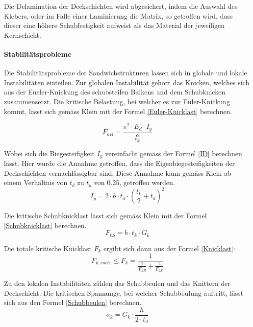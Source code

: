     Die Delamination der Deckschichten wird abgesichert, indem die Auswahl des Klebers, oder im Falle einer Laminierung die Matrix, so getroffen wird, dass dieser eine höhere Schubfestigkeit aufweist als das Material der jeweiligen Kernschicht.

    \paragraph{Stabilitätsprobleme}
    Die Stabilitätsprobleme der Sandwichstrukturen lassen sich in globale und lokale Instabilitäten einteilen. Zur globalen Instabilität gehört das Knicken, welches sich aus der Eueler-Knickung des schubsteifen Balkens und dem Schubknicken zusammensetzt. Die kritische Belastung, bei welcher es zur Euler-Knickung kommt, lässt sich gemäss Klein \cite{klein} mit der Formel \ref{Euler-Knicklast} berechnen.

    \begin{equation}
      \label{Euler-Knicklast}
      F_{kB}=\frac{\pi^2 \cdot E_d \cdot I_y}{l_k^{2}}
    \end{equation}

    Wobei sich die Biegesteifigkeit $I_y$ vereinfacht gemäss der Formel \ref{ID} berechnen lässt. Hier wurde die Annahme getroffen, dass die Eigenbiegesteifigkeiten der Deckschichten vernachlässigbar sind. Diese Annahme kann gemäss Klein \cite{klein} ab einem Verhältnis von $t_d$ zu $t_k$ von 0.25, getroffen werden.
    \begin{equation}
      \label{ID}
      I_y = 2 \cdot b \cdot t_d \cdot \left( \frac{t_k}{2} + t_d \right )^{2}
    \end{equation}

    Die kritische Schubknicklast lässt sich gemäss Klein \cite{klein} mit der Formel \ref{Schubknicklast} berechnen.
    \begin{equation}
      \label{Schubknicklast}
      F_{kS} = b \cdot t_k \cdot G_k
    \end{equation}

    Die totale kritische Knicklast \(F_k\) ergibt sich dann aus der Formel \ref{Knicklast}:
    \begin{equation}
      \label{Knicklast}
      F_{k, vorh.} \leq F_k=\frac{1}{\frac{1}{F_{kB}}+\frac{1}{F_{kS}}}
    \end{equation}

    Zu den lokalen Instabilitäten zählen das Schubbeulen und das Knittern der Deckschicht. Die kritischen Spannunge, bei welcher Schubbeulung auftritt, lässt sich aus den Formel \ref{Schubbeulen} berechnen. \cite{ETH}
    \begin{equation}
      \label{Schubbeulen}
      \sigma_k = G_k \cdot \frac{h}{2 \cdot t_d}
    \end{equation}

